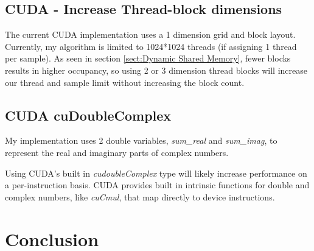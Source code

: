 \documentclass[11pt,a4paper]{article}
\begin{document}
\subsection{CUDA - Increase Thread-block dimensions}
The current CUDA implementation uses a 1 dimension grid and block layout. Currently, my algorithm is limited to 1024*1024 threads (if assigning 1 thread per sample). As seen in section \ref{sect:Dynamic Shared Memory}, fewer blocks results in higher occupancy, so using 2 or 3 dimension thread blocks will increase our thread and sample limit without increasing the block count. 

\subsection{CUDA cuDoubleComplex}
My implementation uses 2 double variables, \textit{sum\_real} and \textit{sum\_imag}, to represent the real and imaginary parts of complex numbers.

Using CUDA's built in \textit{cudoubleComplex} type will likely increase performance on a per-instruction basis. CUDA provides built in intrinsic functions for double and complex numbers, like \textit{cuCmul}, that map directly to device instructions.

\newpage
\section{Conclusion}
\end{document}
